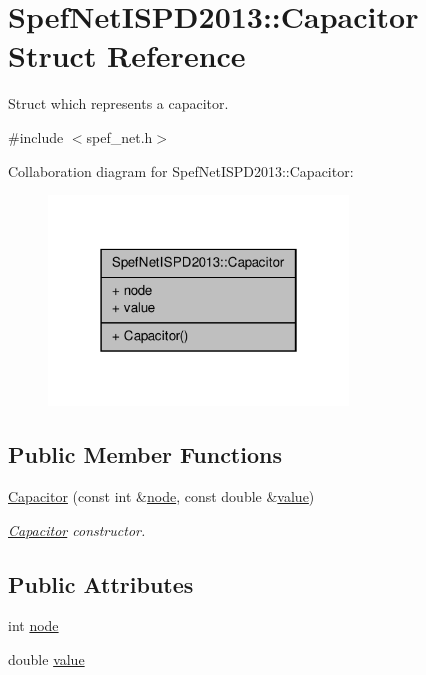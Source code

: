 \hypertarget{structSpefNetISPD2013_1_1Capacitor}{\section{Spef\-Net\-I\-S\-P\-D2013\-:\-:Capacitor Struct Reference}
\label{structSpefNetISPD2013_1_1Capacitor}
}


Struct which represents a capacitor.  




{\ttfamily \#include $<$spef\-\_\-net.\-h$>$}



Collaboration diagram for Spef\-Net\-I\-S\-P\-D2013\-:\-:Capacitor\-:\nopagebreak
\begin{figure}[H]
\begin{center}
\leavevmode
\includegraphics[width=226pt]{structSpefNetISPD2013_1_1Capacitor__coll__graph}
\end{center}
\end{figure}
\subsection*{Public Member Functions}
\begin{DoxyCompactItemize}
\item 
\hyperlink{structSpefNetISPD2013_1_1Capacitor_a4aa1ee73d32e9e916057e24a229f3757}{Capacitor} (const int \&\hyperlink{structSpefNetISPD2013_1_1Capacitor_a137cb22b268fa33013b463c040b66240}{node}, const double \&\hyperlink{structSpefNetISPD2013_1_1Capacitor_a7aed9c0945e3baccf5d774352400a238}{value})
\begin{DoxyCompactList}\small\item\em \hyperlink{structSpefNetISPD2013_1_1Capacitor}{Capacitor} constructor. \end{DoxyCompactList}\end{DoxyCompactItemize}
\subsection*{Public Attributes}
\begin{DoxyCompactItemize}
\item 
int \hyperlink{structSpefNetISPD2013_1_1Capacitor_a137cb22b268fa33013b463c040b66240}{node}
\item 
double \hyperlink{structSpefNetISPD2013_1_1Capacitor_a7aed9c0945e3baccf5d774352400a238}{value}
\end{DoxyCompactItemize}



